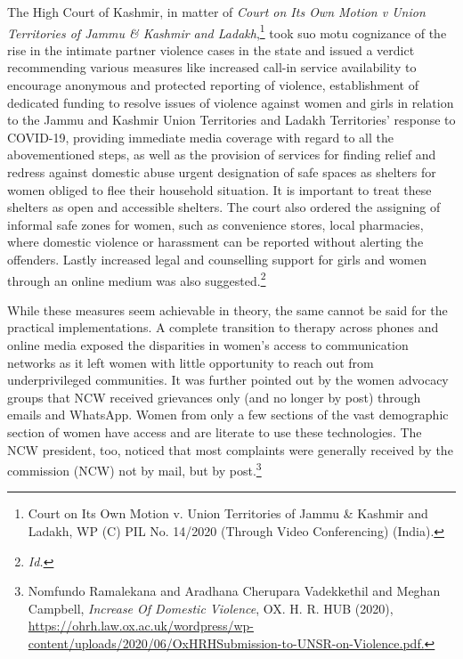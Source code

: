 \begin{multicols}{2}
\noi
The High Court of Kashmir, in matter of \textit{Court on Its Own Motion v Union Territories of
Jammu \& Kashmir and Ladakh},\footnote{Court on Its Own Motion v. Union Territories of Jammu \& Kashmir and Ladakh, WP (C) PIL No. 14/2020
(Through Video Conferencing) (India).} took suo motu cognizance of the rise in the intimate partner
violence cases in the state and issued a verdict recommending various measures like
increased call-in service availability to encourage anonymous and protected reporting of
violence, establishment of dedicated funding to resolve issues of violence against women and girls in relation to the Jammu and Kashmir Union Territories and Ladakh Territories'
response to COVID-19, providing immediate media coverage with regard to all the abovementioned steps, as well as the provision of services for finding relief and redress against
domestic abuse urgent designation of safe spaces as shelters for women obliged to flee their
household situation. It is important to treat these shelters as open and accessible shelters. The
court also ordered the assigning of informal safe zones for women, such as convenience
stores, local pharmacies, where domestic violence or harassment can be reported without
alerting the offenders. Lastly increased legal and counselling support for girls and women
through an online medium was also suggested.\footnote{\textit{Id.}}

\vspace{-.1cm}

\noi
While these measures seem achievable in theory, the same cannot be said for the practical
implementations. A complete transition to therapy across phones and online media exposed
the disparities in women's access to communication networks as it left women with little
opportunity to reach out from underprivileged communities. It was further pointed out by the
women advocacy groups that NCW received grievances only (and no longer by post) through
emails and WhatsApp. Women from only a few sections of the vast demographic section of
women have access and are literate to use these technologies. The NCW president, too,
noticed that most complaints were generally received by the commission (NCW) not by mail,
but by post.\footnote{Nomfundo Ramalekana and Aradhana Cherupara Vadekkethil and Meghan Campbell, \textit{Increase Of Domestic
Violence}, OX. H. R. HUB (2020), \url{https://ohrh.law.ox.ac.uk/wordpress/wp-content/uploads/2020/06/OxHRHSubmission-to-UNSR-on-Violence.pdf.}}

\vspace{-.1cm}


\end{multicols}
